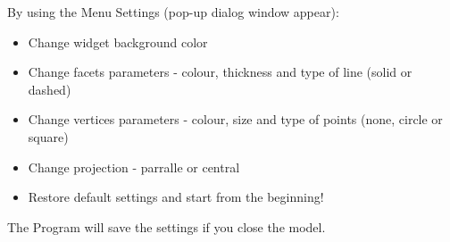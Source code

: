 \documentclass[12pt, a4paper]{article}
\begin{document}
By using the Menu Settings (pop-up dialog window appear):
\begin{itemize}
    \item Change widget background color
    \item Change facets parameters - colour, thickness and type of line (solid or dashed)
    \item Change vertices parameters - colour, size and type of points (none, circle or square)
    \item Change projection - parralle or central
    \item Restore default settings and start from the beginning!
\end{itemize}

The Program will save the settings if you close the model.
\end{document}
